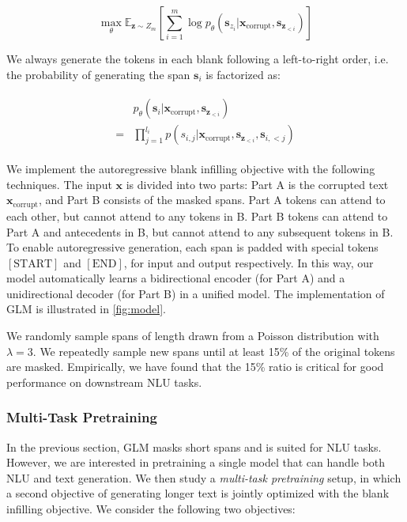 \begin{equation}
    \max_\theta \mathbb{E}_{\boldsymbol{z}\sim Z_m}\left[\sum_{i=1}^m\log p_\theta(\boldsymbol{s}_{z_i}|\boldsymbol{x}_{\text{corrupt}},\boldsymbol{s}_{\boldsymbol{z}_{<i}})\right]
    \label{eqn:objective}
\end{equation}

We always generate the tokens in each blank following a left-to-right order, i.e. the probability of generating the span $\boldsymbol{s}_i$ is factorized as:

\begin{align}
\begin{split}
    &p_\theta(\boldsymbol{s}_i|\boldsymbol{x}_{\text{corrupt}},\boldsymbol{s}_{\boldsymbol{z}_{<i}})\\
    =&\prod_{j=1}^{l_i} p(s_{i,j}|\boldsymbol{x}_{\text{corrupt}},\boldsymbol{s}_{\boldsymbol{z}_{<i}},\boldsymbol{s}_{i,<j})
\end{split}
\end{align}

We implement the autoregressive blank infilling objective with the following techniques. The input $\boldsymbol{x}$ is divided into two parts: Part A is the corrupted text $\boldsymbol{x}_{\text{corrupt}}$, and Part B consists of the masked spans. Part A tokens can attend to each other, but cannot attend to any tokens in B. Part B tokens can attend to Part A and antecedents in B, but cannot attend to any subsequent tokens in B. To enable autoregressive generation, each span is padded with special tokens $[\text{START}]$ and $[\text{END}]$, for input and output respectively. In this way, our model automatically learns a bidirectional encoder (for Part A) and a unidirectional decoder (for Part B) in a unified model. The implementation of GLM is illustrated in \ref{fig:model}.

We randomly sample spans of length drawn from a Poisson distribution with $\lambda=3$. We repeatedly sample new spans until at least 15\% of the original tokens are masked. Empirically, we have found that the 15\% ratio is critical for good performance on downstream NLU tasks.

\subsubsection{Multi-Task Pretraining}
\label{subsec:multitask}

In the previous section, GLM masks short spans and is suited for NLU tasks. However, we are interested in pretraining a single model that can handle both NLU and text generation. We then study a \textit{multi-task pretraining} setup, in which a second objective of generating longer text is jointly optimized with the blank infilling objective. We consider the following two objectives:

